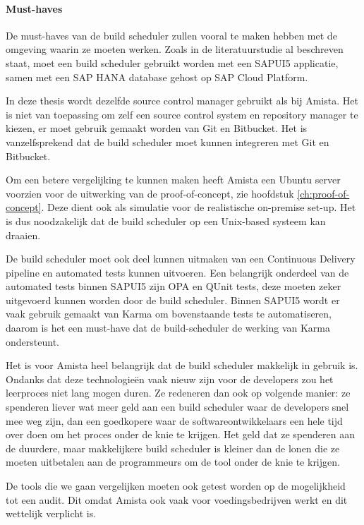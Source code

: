             \paragraph{Must-haves}
            De must-haves van de build scheduler zullen vooral te maken hebben met de omgeving waarin ze moeten werken. Zoals in de literatuurstudie al beschreven staat, moet een build scheduler gebruikt worden met een SAPUI5 applicatie, samen met een SAP HANA database gehost op SAP Cloud Platform.
            
            In deze thesis wordt dezelfde source control manager gebruikt als bij Amista. Het is niet van toepassing om zelf een source control system en repository manager te kiezen, er moet gebruik gemaakt worden van Git en Bitbucket. Het is vanzelfsprekend dat de build scheduler moet kunnen integreren met Git en Bitbucket.

            Om een betere vergelijking te kunnen maken heeft Amista een Ubuntu server voorzien voor de uitwerking van de proof-of-concept, zie hoofdstuk \ref{ch:proof-of-concept}. Deze dient ook als simulatie voor de realistische on-premise set-up. Het is dus noodzakelijk dat de build scheduler op een Unix-based systeem kan draaien.
            
            De build scheduler moet ook deel kunnen uitmaken van een Continuous Delivery pipeline en automated tests kunnen uitvoeren. Een belangrijk onderdeel van de automated tests binnen SAPUI5 zijn OPA en QUnit  tests, deze moeten zeker uitgevoerd kunnen worden door de build scheduler.
            Binnen SAPUI5 wordt er vaak gebruik gemaakt van Karma om bovenstaande tests te automatiseren, daarom is het een must-have dat de build-scheduler de werking van Karma ondersteunt.
            
            Het is voor Amista heel belangrijk dat de build scheduler makkelijk in gebruik is. Ondanks dat deze technologieën vaak nieuw zijn voor de developers zou het leerproces niet lang mogen duren. Ze redeneren dan ook op volgende manier: ze spenderen liever wat meer geld aan een build scheduler waar de developers snel mee weg zijn, dan een goedkopere waar de softwareontwikkelaars een hele tijd over doen om het proces onder de knie te krijgen. Het geld dat ze spenderen aan de duurdere, maar makkelijkere build scheduler is kleiner dan de lonen die ze moeten uitbetalen aan de programmeurs om de tool onder de knie te krijgen.
            
            De tools die we gaan vergelijken moeten ook getest worden op de mogelijkheid tot een audit. Dit omdat Amista ook vaak voor voedingsbedrijven werkt en dit wettelijk verplicht is.

